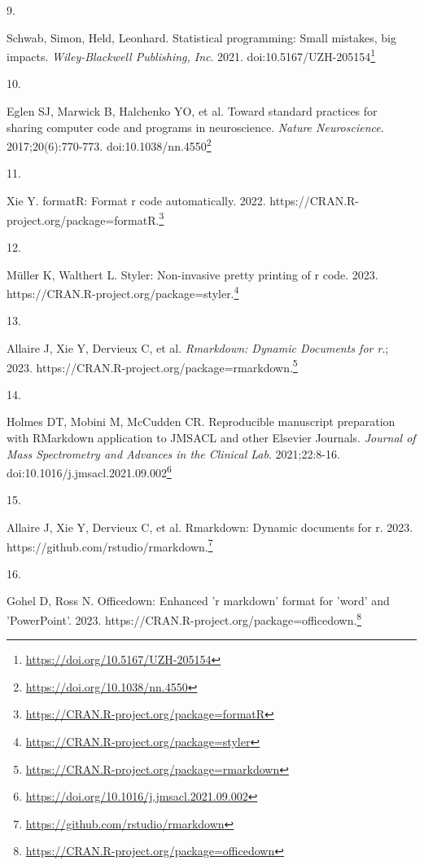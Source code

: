 \documentclass[
  a4paper,
]{book}
\newlength{\cslhangindent}
\newlength{\csllabelwidth}
\newlength{\cslentryspacingunit} %
\newenvironment{CSLReferences}[2] %
 {%
  \setlength{\parindent}{0pt}
  \ifodd #1
  \let\oldpar\par
  \def\par{\hangindent=\cslhangindent\oldpar}
  \fi
  \setlength{\parskip}{#2\cslentryspacingunit}
 }%
 {}
\newcommand{\CSLLeftMargin}[1]{\parbox[t]{\csllabelwidth}{#1}}
\newcommand{\CSLRightInline}[1]{\parbox[t]{\linewidth - \csllabelwidth}{#1}\break}
\renewcommand{\href}[2]{#2\footnote{\url{#1}}}
\begin{document}
\begin{CSLReferences}{0}{0}
\leavevmode{}%
\CSLLeftMargin{9. }%
\CSLRightInline{Schwab, Simon, Held, Leonhard. Statistical programming: Small mistakes, big impacts. \emph{Wiley-Blackwell Publishing, Inc}. 2021. doi:\href{https://doi.org/10.5167/UZH-205154}{10.5167/UZH-205154}}

\leavevmode{}%
\CSLLeftMargin{10. }%
\CSLRightInline{Eglen SJ, Marwick B, Halchenko YO, et al. Toward standard practices for sharing computer code and programs in neuroscience. \emph{Nature Neuroscience}. 2017;20(6):770-773. doi:\href{https://doi.org/10.1038/nn.4550}{10.1038/nn.4550}}

\leavevmode{}%
\CSLLeftMargin{11. }%
\CSLRightInline{Xie Y. formatR: Format r code automatically. 2022. \href{https://CRAN.R-project.org/package=formatR}{https://CRAN.R-project.org/package=formatR.}}

\leavevmode{}%
\CSLLeftMargin{12. }%
\CSLRightInline{Müller K, Walthert L. Styler: Non-invasive pretty printing of r code. 2023. \href{https://CRAN.R-project.org/package=styler}{https://CRAN.R-project.org/package=styler.}}

\leavevmode{}%
\CSLLeftMargin{13. }%
\CSLRightInline{Allaire J, Xie Y, Dervieux C, et al. \emph{Rmarkdown: Dynamic Documents for r}.; 2023. \href{https://CRAN.R-project.org/package=rmarkdown}{https://CRAN.R-project.org/package=rmarkdown.}}

\leavevmode{}%
\CSLLeftMargin{14. }%
\CSLRightInline{Holmes DT, Mobini M, McCudden CR. Reproducible manuscript preparation with RMarkdown application to JMSACL and other Elsevier Journals. \emph{Journal of Mass Spectrometry and Advances in the Clinical Lab}. 2021;22:8-16. doi:\href{https://doi.org/10.1016/j.jmsacl.2021.09.002}{10.1016/j.jmsacl.2021.09.002}}

\leavevmode{}%
\CSLLeftMargin{15. }%
\CSLRightInline{Allaire J, Xie Y, Dervieux C, et al. Rmarkdown: Dynamic documents for r. 2023. \href{https://github.com/rstudio/rmarkdown}{https://github.com/rstudio/rmarkdown.}}

\leavevmode{}%
\CSLLeftMargin{16. }%
\CSLRightInline{Gohel D, Ross N. Officedown: Enhanced 'r markdown' format for 'word' and 'PowerPoint'. 2023. \href{https://CRAN.R-project.org/package=officedown}{https://CRAN.R-project.org/package=officedown.}}


\end{CSLReferences}
\end{document}
